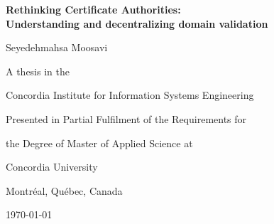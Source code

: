 

     \vspace*{2ex}
     \begin{center}
       {\bf Rethinking Certificate Authorities: \\Understanding and decentralizing domain validation}\\
       {\bf  }
     \end{center}
     \vspace{10ex}
     \begin{center}
	Seyedehmahsa Moosavi
     \end{center}
     \vspace{11ex}
     \begin{center}
        A thesis in the
     \end{center}
     \begin{center}
        Concordia Institute for Information Systems Engineering
     \end{center}
     \vspace{14ex}
     \begin{center}
        Presented in Partial Fulfilment of the Requirements for
     \end{center}
     \vspace*{-3ex}
     \begin{center}
        the Degree of Master of Applied Science at
     \end{center}
     \vspace*{-3ex}
     \begin{center}
        Concordia University
     \end{center}
     \vspace*{-3ex}
     \begin{center}
        Montr\'{e}al, Qu\'{e}bec, Canada
     \end{center}
     \vspace{10ex}
     \begin{center}
        \today
     \end{center}
 
 \clearpage
 
